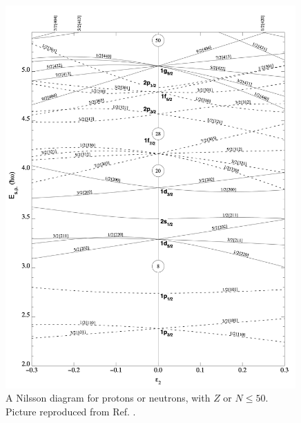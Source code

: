 \begin{figure}
    \centering
    \includegraphics[width=0.99\textwidth]{Chapters/Figures/nillson_diagram.png}
    \caption{A Nilsson diagram for protons or neutrons, with $Z$ or $N\leq50$. Picture reproduced from Ref. \cite{ragnarsson2005shapes}.}
    \label{nillson-diagram}
\end{figure}

